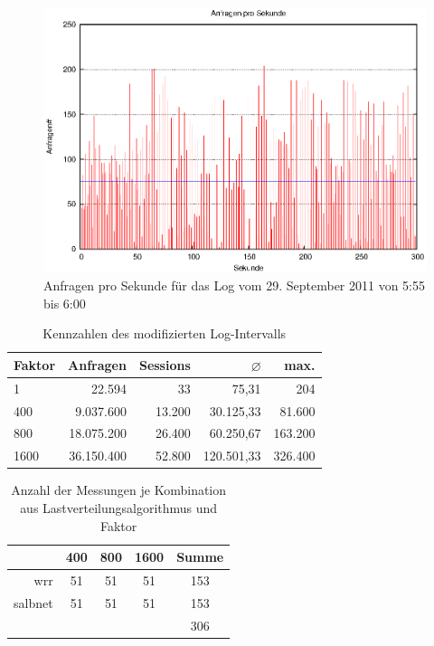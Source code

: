 \documentclass[a4paper, 12pt, BCOR10mm, DIV12, toc=bibliography, toc=listof, german]{scrbook}
\begin{document}
			\begin{figure}
				\centering
				\includegraphics[width=\textwidth]{plots/requests}
				\caption{Anfragen pro Sekunde für das Log vom 29. September 2011 von 5:55 bis 6:00}
				\label{fig:requests}
			\end{figure}

			\begin{table}
				\centering
				\begin{tabular}{|lrrrr|}\hline
					Faktor & Anfragen & Sessions & $\varnothing$ \nicefrac{Anfragen}{Sekunde} &
					max. \nicefrac{Anfragen}{Sekunde} \\\hline\hline
					1 & 22.594 & 33 & 75,31 & 204 \\
					400 & 9.037.600 & 13.200 & 30.125,33 & 81.600 \\
					800 & 18.075.200 & 26.400 & 60.250,67 & 163.200 \\
					1600 & 36.150.400 & 52.800 & 120.501,33 & 326.400 \\\hline
				\end{tabular}
				\caption{Kennzahlen des modifizierten Log-Intervalls}
				\label{tab:multiply}
			\end{table}

			\begin{table}
				\centering
				\begin{tabular}{|r|c|c|c||c|}\hline
					& 400 & 800 & 1600 & Summe \\\hline
					wrr & 51 & 51 & 51 & 153 \\
					salbnet & 51 & 51 & 51 & 153 \\
												 & & & & 306 \\\hline
				\end{tabular}
				\caption{Anzahl der Messungen je Kombination aus Lastverteilungsalgorithmus und Faktor}
				\label{tab:messplan}
			\end{table}
\end{document}

